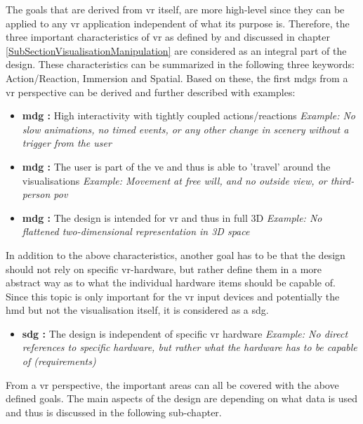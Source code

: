 The goals that are derived from \gls{vr} itself, are more high-level since they can be applied to any \gls{vr} application independent of what its purpose is. Therefore, the three important characteristics of \gls{vr} as defined by \cite{Stone1994} and discussed in chapter \ref{SubSectionVisualisationManipulation} are considered as an integral part of the design. These characteristics can be summarized in the following three keywords: Action/Reaction, Immersion and Spatial. Based on these, the first \glspl{mdg} from a \gls{vr} perspective can be derived and further described with examples:
\begin{itemize}[noitemsep,nolistsep]
	\item \textbf{\gls{mdg} :} High interactivity with tightly coupled actions/reactions \newline
		\textit{Example: No slow animations, no timed events, or any other change in scenery without a trigger from the user}
	\item \textbf{\gls{mdg} :} The user is part of the \gls{ve} and thus is able to 'travel' around the visualisations \newline
		\textit{Example: Movement at free will, and no outside view, or third-person \gls{pov}}
	\item \textbf{\gls{mdg} :} The design is intended for \gls{vr} and thus in full 3D \newline
		\textit{Example: No flattened two-dimensional representation in 3D space}
\end{itemize}
In addition to the above characteristics, another goal has to be that the design should not rely on specific \gls{vr}-hardware, but rather define them in a more abstract way as to what the individual hardware items should be capable of. Since this topic is only important for the \gls{vr} input devices and potentially the \gls{hmd} but not the visualisation itself, it is considered as a \gls{sdg}.
\begin{itemize}[noitemsep,nolistsep]
	\item \textbf{\gls{sdg} :} The design is independent of specific \gls{vr} hardware \newline
		\textit{Example: No direct references to specific hardware, but rather what the hardware has to be capable of (requirements)}
\end{itemize}
From a \gls{vr} perspective, the important areas can all be covered with the above defined goals. The main aspects of the design are depending on what data is used and thus is discussed in the following sub-chapter.


